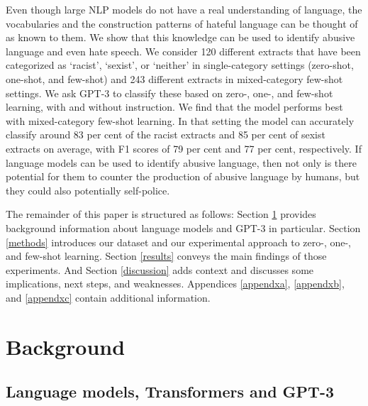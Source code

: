 \documentclass{bmcart}
\begin{document}
Even though large NLP models do not have a real understanding of language, the vocabularies and the construction patterns of hateful language can be thought of as known to them. We show that this knowledge can be used to identify abusive language and even hate speech. We consider 120 different extracts that have been categorized as `racist', `sexist', or `neither' in single-category settings (zero-shot, one-shot, and few-shot) and 243 different extracts in mixed-category few-shot settings. We ask GPT-3 to classify these based on zero-, one-, and few-shot learning, with and without instruction. We find that the model performs best with mixed-category few-shot learning. In that setting the model can accurately classify around 83 per cent of the racist extracts and 85 per cent of sexist extracts on average, with F1 scores of 79 per cent and 77 per cent, respectively. If language models can be used to identify abusive language, then not only is there potential for them to counter the production of abusive language by humans, but they could also potentially self-police.

The remainder of this paper is structured as follows: Section \ref{background} provides background information about language models and GPT-3 in particular. Section \ref{methods} introduces our dataset and our experimental approach to zero-, one-, and few-shot learning. Section \ref{results} conveys the main findings of those experiments. And Section \ref{discussion} adds context and discusses some implications, next steps, and weaknesses. Appendices \ref{appendxa}, \ref{appendxb}, and \ref{appendxc} contain additional information.


\section{Background}\label{background}


\subsection{Language models, Transformers and GPT-3}\label{language-models-transformers-and-gpt-3}
\end{document}
